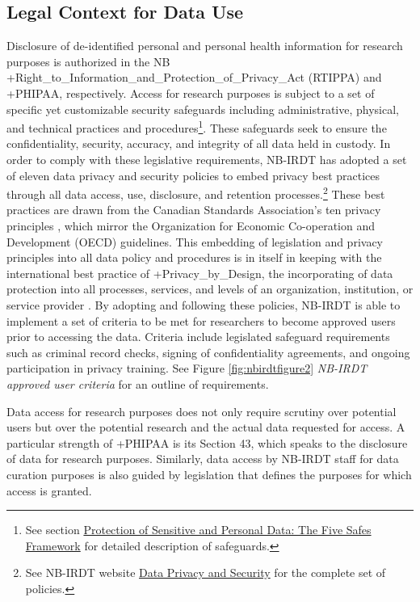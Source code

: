 \documentclass[
]{book}
\begin{document}
\hypertarget{legal-context-for-data-use-2}{%
\subsection{Legal Context for Data Use}\label{legal-context-for-data-use-2}}

Disclosure of de-identified personal and personal health information for research purposes is authorized in the NB +Right\_to\_Information\_and\_Protection\_of\_Privacy\_Act\textbar{} (RTIPPA) and +PHIPAA\textbar, respectively. Access for research purposes is subject to a set of specific yet customizable security safeguards including administrative, physical, and technical practices and procedures\footnote{See section \protect\hyperlink{protection-of-sensitive-and-personal-data-the-five-safes-framework-8}{Protection of Sensitive and Personal Data: The Five Safes Framework} for detailed description of safeguards.}. These safeguards seek to ensure the confidentiality, security, accuracy, and integrity of all data held in custody. In order to comply with these legislative requirements, NB-IRDT has adopted a set of eleven data privacy and security policies to embed privacy best practices through all data access, use, disclosure, and retention processes.\footnote{See NB-IRDT website \href{https://www.nbirdt.ca/data-privacy-and-security}{Data Privacy and Security} for the complete set of policies.} These best practices are drawn from the Canadian Standards Association's ten privacy principles \citep{governmentofcanada2000a, officeoftheprivacycommissionerofcanada2019}, which mirror the Organization for Economic Co-operation and Development (OECD) guidelines. This embedding of legislation and privacy principles into all data policy and procedures is in itself in keeping with the international best practice of +Privacy\_by\_Design\textbar, the incorporating of data protection into all processes, services, and levels of an organization, institution, or service provider \citep{hertzman2012}. By adopting and following these policies, NB-IRDT is able to implement a set of criteria to be met for researchers to become approved users prior to accessing the data. Criteria include legislated safeguard requirements such as criminal record checks, signing of confidentiality agreements, and ongoing participation in privacy training. See Figure \ref{fig:nbirdtfigure2} \emph{NB-IRDT approved user criteria} for an outline of requirements.

Data access for research purposes does not only require scrutiny over potential users but over the potential research and the actual data requested for access. A particular strength of +PHIPAA\textbar{} is its Section 43, which speaks to the disclosure of data for research purposes. Similarly, data access by NB-IRDT staff for data curation purposes is also guided by legislation that defines the purposes for which access is granted.
\end{document}
